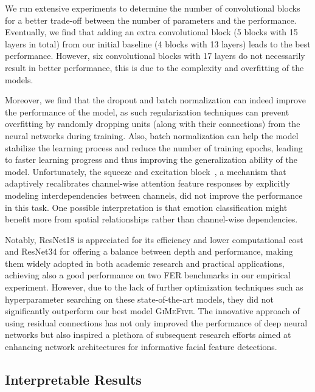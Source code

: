 We run extensive experiments to determine the number of convolutional blocks for a better trade-off between the number of parameters and the performance. 
Eventually, we find that adding an extra convolutional block 
(5 blocks with 15 layers in total) from our initial baseline (4 blocks with 13 layers)
leads to the best performance. 
However, six convolutional blocks with 17 layers do not necessarily result in better performance, 
this is due to the complexity and overfitting of the models. 

Moreover, 
we find that the dropout and batch normalization can indeed improve the performance of the model, 
as such regularization techniques can prevent overfitting by randomly dropping units 
(along with their connections) from the neural networks during training. 
Also, 
batch normalization can help the model stabilize the learning process and reduce the number of training epochs, 
leading to faster learning progress and thus improving the generalization ability of the model. 
Unfortunately, the squeeze and excitation block~\cite{HuSASW20}, 
a mechanism that adaptively recalibrates channel-wise attention feature responses by explicitly modeling interdependencies between channels, 
did not improve the performance in this task. 
One possible interpretation is that emotion classification might benefit more from spatial relationships rather than channel-wise dependencies. 

Notably, 
ResNet18 is appreciated for its efficiency and lower computational cost and ResNet34 for offering a balance between depth and performance, 
making them widely adopted in both academic research and practical applications, 
achieving also a good performance on two FER benchmarks in our empirical experiment. 
However, due to the lack of further optimization techniques such as hyperparameter searching on these state-of-the-art models, 
they did not significantly outperform our best model \textsc{GiMeFive}. 
The innovative approach of using residual connections has not only improved the performance of deep neural networks 
but also inspired a plethora of subsequent research efforts aimed at enhancing network architectures for informative facial feature detections.

\subsection{Interpretable Results}
\label{sec:evaluation:inter}

